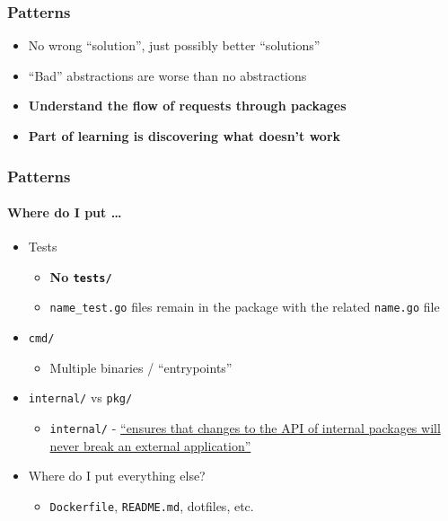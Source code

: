 
\begin{frame}[fragile]
  \frametitle{Patterns}
  \begin{itemize}
    \item No wrong ``solution'', just possibly better ``solutions''
    \pause
    \item ``Bad'' abstractions are worse than no abstractions
    \pause
    \item \textbf{Understand the flow of requests through packages}
    \pause
    \item \textbf{Part of learning is discovering what doesn't work}
  \end{itemize}
\end{frame}

\begin{frame}[fragile]
  \frametitle{Patterns}
  \framesubtitle{Where do I put \dots}

  \begin{itemize}
    \item{Tests}
    \begin{itemize}
      \item \textbf{No \texttt{tests/}}
      \item \texttt{name\_test.go} files remain in the package with the related \texttt{name.go} file
    \end{itemize}
    \item \texttt{cmd/}
      \begin{itemize}
        \item Multiple binaries / ``entrypoints''
      \end{itemize}
    \item \texttt{internal/} vs \texttt{pkg/}
      \begin{itemize}
        \item \texttt{internal/} - \href{https://blog.gopheracademy.com/advent-2016/go-and-package-focused-design/}{``ensures that changes to the API of internal packages will never break an external application''}
      \end{itemize}
    \item Where do I put everything else?
      \begin{itemize}
        \item \texttt{Dockerfile}, \texttt{README.md}, dotfiles, etc.
      \end{itemize}
  \end{itemize}
\end{frame}

